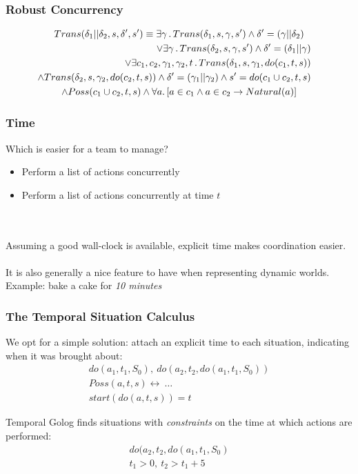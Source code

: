 \documentclass[compress]{beamer}
\begin{document}
\begin{frame}
\frametitle{Robust Concurrency}
\begin{multline*}
Trans(\delta_{1}||\delta_{2},s,\delta',s')\equiv\exists\gamma\,.\, Trans(\delta_{1},s,\gamma,s')\wedge\delta'=(\gamma||\delta_{2})\\
\shoveright{\vee\exists\gamma\,.\, Trans(\delta_{2},s,\gamma,s')\wedge\delta'=(\delta_{1}||\gamma)}\\
\shoveright{\vee\exists c_{1},c_{2},\gamma_{1},\gamma_{2},t\,.\, Trans(\delta_{1},s,\gamma_{1},do(c_{1},t,s))}\\
\shoveright{\wedge Trans(\delta_{2},s,\gamma_{2},do(c_{2},t,s))\wedge\delta'=(\gamma_1||\gamma_2)\wedge s'=do(c_1\cup c_2,t,s)}\\
\wedge Poss(c_1\cup c_2,t,s)\wedge\forall a.\left[a\in c_{1}\wedge a\in c_{2}\rightarrow Natural(a)\right]
\end{multline*}
\end{frame}

\begin{frame}
\frametitle{Time}
Which is easier for a team to manage?
\begin{itemize}
  \pause
  \item Perform a list of actions concurrently
  \pause
  \item Perform a list of actions concurrently at time $t$
\end{itemize}
\ \\
\ \\
\pause
Assuming a good wall-clock is available, explicit time makes coordination easier.\\
\ \\
It is also generally a nice feature to have when representing dynamic worlds.
Example: bake a cake for \emph{10 minutes}
\end{frame}

\begin{frame}
\frametitle{The Temporal Situation Calculus}
We opt for a simple solution: attach an explicit time to each situation,
indicating when it was brought about:\[
\begin{array}{c}
do(a_1,t_1,S_0),\ do(a_2,t_2,do(a_1,t_1,S_0))\\
Poss(a,t,s) \leftrightarrow\ \dots\\
start(do(a,t,s)) = t
\end{array}\]

Temporal Golog finds situations with \emph{constraints} on the
time at which actions are performed:\[
\begin{array}{c}
do(a_2,t_2,do(a_1,t_1,S_0)\\
t_1>0,\ t_2>t_1+5
\end{array}\]
\end{frame}
\end{document}
